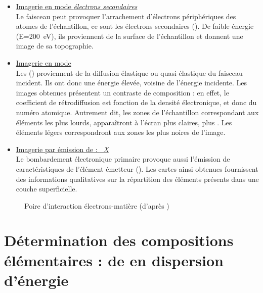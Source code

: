\begin{itemize}
  \item \uline{Imagerie en mode \emph{électrons secondaires}}\\
        Le faisceau peut provoquer l'arrachement d'électrons 
        périphériques des atomes de l'échantillon, ce sont les 
        électrons secondaires (). De faible énergie 
        (E=\SI{200}{\electronvolt}), ils proviennent de la surface 
        de l'échantillon et donnent une image de sa topographie. 
  \item \uline{Imagerie en mode \emph{\ERD}}\\ 
        Les \ERD () proviennent de la diffusion 
        élastique ou quasi-élastique du faisceau incident. Ils ont 
        donc une énergie élevée, voisine de l'énergie incidente. 
        Les images obtenues présentent un contraste de composition : 
        en effet, le coefficient de rétrodiffusion est fonction de 
        la densité électronique, et donc du numéro atomique. 
        Autrement dit, les zones de l'échantillon correspondant aux 
        éléments les plus lourds, apparaîtront à l'écran plus claires, 
        plus . Les éléments légers correspondront 
        aux zones les plus noires de l'image.
  \item \uline{Imagerie par émission de \RX : \emph{\carto~X}}\\
        Le bombardement électronique primaire provoque aussi 
        l'émission de \RX caractéristiques de l'élément émetteur 
        (). Les cartes ainsi obtenues fournissent des 
        informations qualitatives sur la répartition des éléments 
        présents dans une couche superficielle.
\end{itemize}

\begin{figure}[htb]
  \caption[Poire d'interaction électrons-matière]
          {Poire d'interaction électrons-matière 
           (d'après \cite{web_MEB})}
  \label{fig:meb}
\end{figure}

\section{Détermination des compositions élémentaires : \spectro de 
         \RX en dispersion d'énergie}

